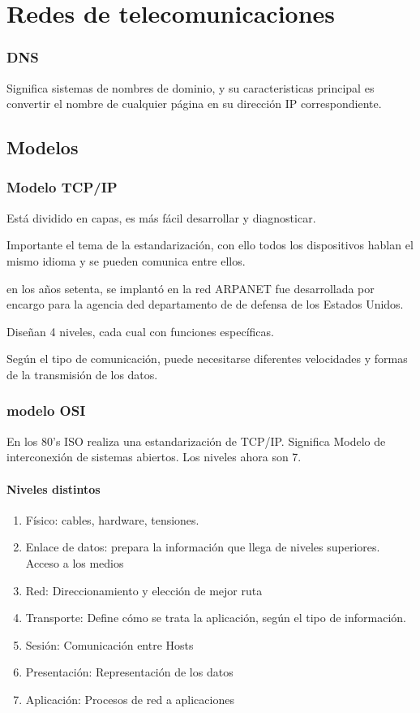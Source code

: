\chapter{Redes de telecomunicaciones}

\subsection{DNS}

Significa sistemas de nombres de dominio, y su caracteristicas principal es convertir el nombre de cualquier página en su dirección IP correspondiente. 

\section{Modelos}

\subsection{Modelo TCP/IP}

Está dividido en capas, es más fácil desarrollar y diagnosticar.

Importante el tema de la estandarización, con ello todos los dispositivos hablan el mismo idioma y se pueden comunica entre ellos. 

en los años setenta, se implantó en la red ARPANET fue desarrollada por encargo para la agencia ded departamento de de defensa de los Estados Unidos.

Diseñan 4 niveles, cada cual con funciones específicas. 

Según el tipo de comunicación, puede necesitarse diferentes velocidades y formas de la transmisión de los datos. 


\subsection{modelo OSI}

En los 80's ISO realiza una estandarización de TCP/IP. Significa Modelo de interconexión de sistemas abiertos. Los niveles ahora son 7. 
\subsubsection{Niveles distintos}

\begin{enumerate}
    \item Físico: cables, hardware, tensiones.
    \item Enlace de datos: prepara la información que llega de niveles superiores. Acceso a los medios
    \item Red: Direccionamiento y elección de mejor ruta
    \item Transporte: Define cómo se trata la aplicación, según el tipo de información. 
    \item Sesión: Comunicación entre Hosts
    \item Presentación: Representación de los datos
    \item Aplicación: Procesos de red a aplicaciones
\end{enumerate}

